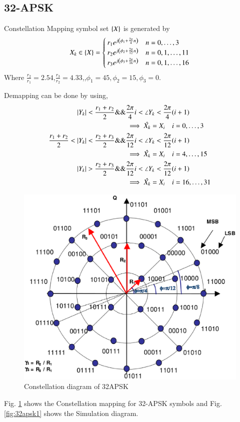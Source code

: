 \documentclass[journal,12pt,twocolumn]{IEEEtran}
\begin{document}
\subsection{32-APSK}
Constellation Mapping symbol set $\left\{X\right\}$ is generated by
\begin{equation}
X_k \in \left\{X\right\}=
\begin{cases}
r_1 e^{j\left(\phi_1+\frac{2\pi}{4}n\right)}& n=0,\dots,3\\
r_2 e^{j\left(\phi_2+\frac{2\pi}{12}n\right)}& n=0,1,\dots,11\\
r_3 e^{j\left(\phi_3+\frac{2\pi}{16}n\right)}& n=0,1,\dots,16
\end{cases}
\end{equation}
Where $\frac{r_2}{r_1}=2.54$,$\frac{r_3}{r_2}=4.33$,,$\phi_1=45,\phi_2=15,\phi_3=0$.

Demapping can be done by using,
\begin{align}
\left\vert Y_k\right\vert<\frac{r_1+r_2}{2} \&\& & \frac{2\pi }{4}i < \angle{Y_k} < \frac{2\pi }{4}(i+1)\\
& \implies \hat{X_k}=X_i \quad i=0,\dots,3\\
\frac{r_1+r_2}{2}<\left\vert Y_k\right\vert<\frac{r_2+r_3}{2} \&\& & \frac{2\pi }{12}i < \angle{Y_k} < \frac{2\pi }{12}(i+1)\\
& \implies \hat{X_k}=X_i \quad i=4,\dots,15 \\ 
\left\vert Y_k\right\vert>\frac{r_2+r_3}{2} \&\& & \frac{2\pi }{12}i < \angle{Y_k} < \frac{2\pi }{12}(i+1)\\
& \implies \hat{X_k}=X_i \quad i=16,\dots,31
\end{align}

\begin{figure}[!ht]
\begin{center}
\includegraphics[width=\columnwidth]{./figs/32APSK}
\end{center}
\caption{Constellation diagram of 32APSK}
\label{fig:32apsk}
\end{figure}
Fig. \ref{fig:32apsk} shows the Constellation mapping for 32-APSK symbols and  Fig. \ref{fig:32apsk1} shows the Simulation diagram.
\end{document}
